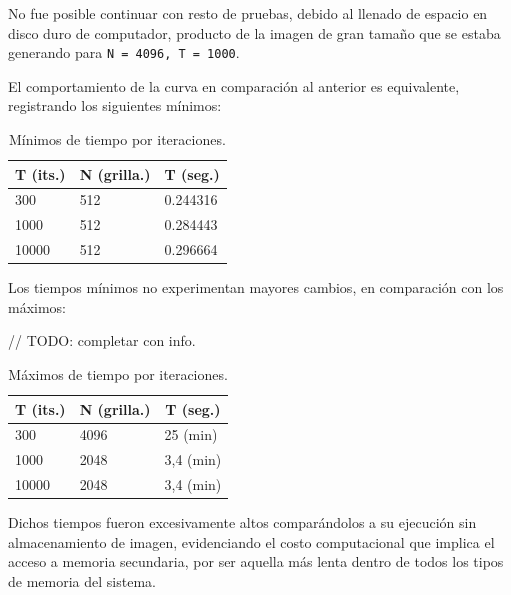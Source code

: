 \documentclass[jou]{apa6}
\begin{document}
No fue posible continuar con resto de pruebas, debido al llenado de espacio en disco duro de computador, producto de la imagen de gran tamaño que se estaba generando para \texttt{N = 4096, T = 1000}.

El comportamiento de la curva en comparación al anterior es equivalente, registrando los siguientes mínimos:

\begin{table}[h]
\centering
\caption{Mínimos de tiempo por iteraciones.}
\label{my-label}
\begin{tabular}{@{}lll@{}}
\toprule
\multicolumn{1}{c}{T (its.)} & \multicolumn{1}{c}{N (grilla.)} & \multicolumn{1}{c}{T (seg.)} \\ \midrule
300                          & 512                          & 0.244316                     \\
1000                         & 512                          & 0.284443                     \\
10000                        & 512                          & 0.296664                     \\ \bottomrule
\end{tabular}
\end{table}

Los tiempos mínimos no experimentan mayores cambios, en comparación con los máximos:

// TODO: completar con info.
\begin{table}[h]
	\centering
	\caption{Máximos de tiempo por iteraciones.}
	\label{my-label}
	\begin{tabular}{@{}lll@{}}
		\toprule
		\multicolumn{1}{c}{T (its.)} & \multicolumn{1}{c}{N (grilla.)} & \multicolumn{1}{c}{T (seg.)} \\ \midrule
		300                          & 4096                         & 25 (min)                     \\
		1000                         & 2048                         & 3,4 (min)                    \\
		10000                        & 2048                         & 3,4 (min)                    \\ \bottomrule
	\end{tabular}
\end{table}

Dichos tiempos fueron excesivamente altos comparándolos a su ejecución sin almacenamiento de imagen, evidenciando el costo computacional que implica el acceso a memoria secundaria, por ser aquella más lenta dentro de todos los tipos de memoria del sistema.
\end{document}
